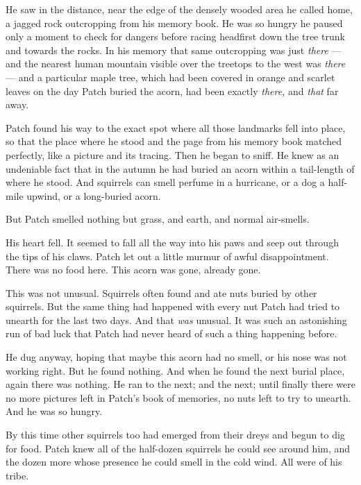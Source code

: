 \documentclass[ebook,oneside,openany,17pt]{memoir}
\newenvironment{tolerant}[1]{%
  \par\tolerance=#1\relax
}{%
  \par
}
\begin{document}
\begin{tolerant}{1000}
He saw in the distance, near the edge of the densely wooded area he
called home, a jagged rock outcropping from his memory book. He was so
hungry he paused only a moment to check for dangers before racing
headfirst down the tree trunk and towards the rocks. In his memory
that same outcropping was just \emph{there} — and the nearest human
mountain visible over the treetops to the west was \emph{there} —
and a particular maple tree, which had been covered in orange and
scarlet leaves on the day Patch buried the acorn, had been exactly
\emph{there,} and \emph{that} far away.
\end{tolerant}

Patch found his way to the exact spot where all those landmarks fell
into place, so that the place where he stood and the page from his
memory book matched perfectly, like a picture and its tracing. Then he
began to sniff. He knew as an undeniable fact that in the autumn he
had buried an acorn within a tail-length of where he stood. And
squirrels can smell perfume in a hurricane, or a dog a half-mile
upwind, or a long-buried acorn.

But Patch smelled nothing but grass, and earth, and normal air-smells.

His heart fell. It seemed to fall all the way into his paws and seep
out through the tips of his claws. Patch let out a little murmur of
awful disappointment. There was no food here. This acorn was gone,
already gone.

\begin{tolerant}{500}
This was not unusual. Squirrels often found and ate nuts buried by
other squirrels. But the same thing had happened with every nut Patch
had tried to unearth for the last two days. And that \emph{was}
unusual. It was such an astonishing run of bad luck that Patch had
never heard of such a thing happening before.
\end{tolerant}

He dug anyway, hoping that maybe this acorn had no smell, or his nose
was not working right. But he found nothing. And when he found the
next burial place, again there was nothing. He ran to the next; and
the next; until finally there were no more pictures left in Patch’s
book of memories, no nuts left to try to unearth. And he was so
hungry.

\begin{tolerant}{500}
By this time other squirrels too had emerged from their dreys and
begun to dig for food. Patch knew all of the half-dozen squirrels he
could see around him, and the dozen more whose presence he could smell
in the cold wind. All were of his tribe.
\end{tolerant}
\end{document}
